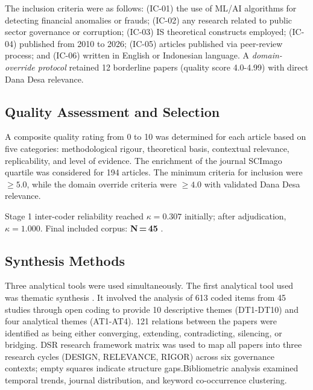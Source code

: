 \documentclass[3p,times,procedia]{elsarticle}
\begin{document}
The inclusion criteria were as follows: (IC-01) the use of ML/AI algorithms for detecting financial anomalies or frauds; (IC-02) any research related to public sector governance or corruption; (IC-03) IS theoretical constructs employed; (IC-04) published from 2010 to 2026; (IC-05) articles published via peer-review process; and (IC-06) written in English or Indonesian language. A \textit{domain-override protocol} retained 12 borderline papers (quality score 4.0-4.99) with direct Dana Desa relevance.

\subsection{Quality Assessment and Selection}

A composite quality rating from 0 to 10 was determined for each article based on five categories: methodological rigour, theoretical basis, contextual relevance, replicability, and level of evidence. The enrichment of the journal SCImago quartile was considered for 194 articles. The minimum criteria for inclusion were $\geq 5.0$, while the domain override criteria were $\geq 4.0$ with validated Dana Desa relevance.

Stage 1 inter-coder reliability reached $\kappa = 0.307$ initially; after adjudication, $\kappa = 1.000$. Final included corpus: \textbf{N\,=\,45} \cite{p001,p002,p003,p004,p005,p006,p007,p008,p009,p010,p011,p012,p013,p014,p015,p016,p017,p018,p019,p020,p021,p022,p023,p024,p025,p026,p027,p028,p029,p030,p031,p032,p033,p034,p035,p036,p037,p038,p039,p040,p041,p042,p043,p044,p045}.

\subsection{Synthesis Methods}

Three analytical tools were used simultaneously. The first analytical tool used was thematic synthesis \cite{method_thomas2008}. It involved the analysis of 613 coded items from 45 studies through open coding to provide 10 descriptive themes (DT1-DT10) and four analytical themes (AT1-AT4). 121 relations between the papers were identified as being either converging, extending, contradicting, silencing, or bridging. DSR research framework matrix \cite{method_hevner2004} was used to map all papers into three research cycles (DESIGN, RELEVANCE, RIGOR) across six governance contexts; empty squares indicate structure gaps.Bibliometric analysis \cite{method_donthu2021} examined temporal trends, journal distribution, and keyword co-occurrence clustering.
\end{document}
